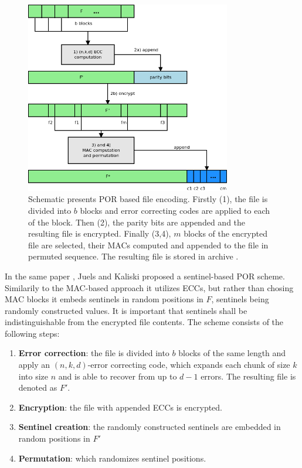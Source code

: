 \begin{figure}[h!]
	\centering
	\includegraphics[width=0.8\textwidth]{images/por-schematic.png}
	\caption{Schematic presents POR based file encoding. Firstly (1), the file is divided into
	$b$ blocks and error correcting codes are applied to each of the block. Then (2), the
	parity bits are appended and the resulting file is encrypted. Finally (3,4), $m$ blocks of the encrypted
	file are selected, their MACs computed and appended to the file in permuted sequence. The resulting
	file is stored in archive \cite{por}.}
	\label{fig:por-modified-file}
\end{figure}

In the same paper \cite{por}, Juels and Kaliski proposed a sentinel-based POR
scheme. Similarily to the MAC-based approach it utilizes ECCs, but rather than
chosing MAC blocks it embeds sentinels in random positions in $F$, sentinels
being randomly constructed values. It is important that sentinels shall be 
indistinguishable from the encrypted file contents. The scheme consists of the
following steps:

\begin{enumerate}
	\item \textbf{Error correction}: the file is divided into $b$ blocks of the
	same length and apply an $(n,k,d)$-error correcting code,
	which expands each chunk of size $k$ into size $n$ and is able to recover
	from up to $d-1$ errors. The resulting file is denoted as $F'$.
	\item \textbf{Encryption}: the file with appended ECCs is encrypted.
	\item \textbf{Sentinel creation}: the randomly constructed sentinels are
	embedded in random positions in $F'$
	\item \textbf{Permutation}: which randomizes sentinel positions.
\end{enumerate}

